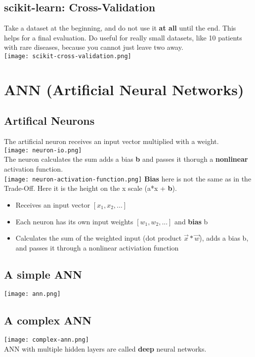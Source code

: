 \subsection{scikit-learn: Cross-Validation}
Take a dataset at the beginning, and do not use it \textbf{at all} until the end.
This helps for a final evaluation. 
Do useful for really small datasets, like 10 patients with rare diseases, because you cannot just leave two away.\\
\texttt{[image: scikit-cross-validation.png]}

\section{ANN (Artificial Neural Networks)}
\subsection{Artifical Neurons}
The artificial neuron receives an input vector multiplied with a weight.\\
\texttt{[image: neuron-io.png]}\\
The neuron calculates the sum adds a bias \textbf{b} and passes it thorugh a \textbf{nonlinear} activation function.\\
\texttt{[image: neuron-activation-function.png]}
\textbf{Bias} here is not the same as in the Trade-Off. Here it is the height on the x scale (a*x + \textbf{b}).

\begin{itemize}
    \item Receives an input vector $[x_1,x_2, ...]$
    \item Each neuron has its own input weights $[w_1, w_2, ...]$ and \textbf{bias} b
    \item Calculates the sum of the weighted input (dot product $\vec{x} * \vec{w}$), adds a bias b, and passes it through a nonlinear activiation function
\end{itemize}
\subsection{A simple ANN}
\texttt{[image: ann.png]}

\subsection{A complex ANN}
\texttt{[image: complex-ann.png]}\\
ANN with multiple hidden layers are called \textbf{deep} neural networks.

